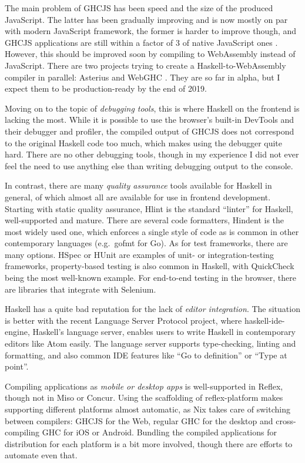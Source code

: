 \documentclass[english,odsaz]{fitthesis}
\begin{document}
The main problem of GHCJS has been speed and the size of the produced
JavaScript. The latter has been gradually improving and is now mostly on par
with modern JavaScript framework, the former is harder to improve though, and
GHCJS applications are still within a factor of 3 of native JavaScript ones
\cite{nanda_bench}. However, this should be improved soon by compiling to
WebAssembly instead of JavaScript. There are two projects trying to create a
Haskell-to-WebAssembly compiler in parallel: Asterius \cite{asterius} and WebGHC
\cite{webghc}. They are so far in alpha, but I expect them to be production-ready
by the end of 2019.

Moving on to the topic of \emph{debugging tools}, this is where Haskell on the frontend
is lacking the most. While it is possible to use the browser's built-in DevTools
and their debugger and profiler, the compiled output of GHCJS does not
correspond to the original Haskell code too much, which makes using the debugger
quite hard. There are no other debugging tools, though in my experience I did
not ever feel the need to use anything else than writing debugging output to the
console.

In contrast, there are many \emph{quality assurance} tools available for Haskell in
general, of which almost all are available for use in frontend
development. Starting with static quality assurance, Hlint is the standard
``linter'' for Haskell, well-supported and mature. There are several code
formatters, Hindent is the most widely used one, which enforces a single style
of code as is common in other contemporary languages (e.g.~gofmt for Go). As for
test frameworks, there are many options. HSpec or HUnit are examples of unit- or
integration-testing frameworks, property-based testing is also common in
Haskell, with QuickCheck~\cite{claessen2011quickcheck} being the most well-known
example. For end-to-end testing in the browser, there are libraries that
integrate with Selenium.

Haskell has a quite bad reputation for the lack of \emph{editor integration}. The
situation is better with the recent Language Server Protocol project, where
haskell-ide-engine, Haskell's language server, enables users to write Haskell in
contemporary editors like Atom easily. The language server supports
type-checking, linting and formatting, and also common IDE features like
``Go to definition'' or ``Type at point''.

Compiling applications as \emph{mobile or desktop apps} is well-supported in Reflex,
though not in Miso or Concur. Using the scaffolding of reflex-platform makes
supporting different platforms almost automatic, as Nix takes care of switching
between compilers: GHCJS for the Web, regular GHC for the desktop and
cross-compiling GHC for iOS or Android. Bundling the compiled applications for
distribution for each platform is a bit more involved, though there are efforts
to automate even that.
\end{document}
